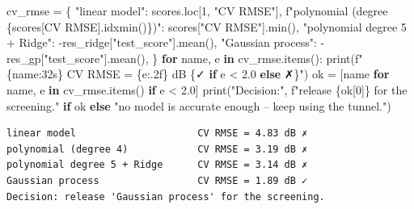 \documentclass[
  letterpaper,
  DIV=11,
  numbers=noendperiod]{scrreprt}
\newenvironment{Shaded}{\begin{snugshade}}{\end{snugshade}}
\newcommand{\BuiltInTok}[1]{\textcolor[rgb]{0.00,0.23,0.31}{#1}}
\newcommand{\ControlFlowTok}[1]{\textcolor[rgb]{0.00,0.23,0.31}{\textbf{#1}}}
\newcommand{\DecValTok}[1]{\textcolor[rgb]{0.68,0.00,0.00}{#1}}
\newcommand{\FloatTok}[1]{\textcolor[rgb]{0.68,0.00,0.00}{#1}}
\newcommand{\KeywordTok}[1]{\textcolor[rgb]{0.00,0.23,0.31}{\textbf{#1}}}
\newcommand{\NormalTok}[1]{\textcolor[rgb]{0.00,0.23,0.31}{#1}}
\newcommand{\OperatorTok}[1]{\textcolor[rgb]{0.37,0.37,0.37}{#1}}
\newcommand{\SpecialCharTok}[1]{\textcolor[rgb]{0.37,0.37,0.37}{#1}}
\newcommand{\SpecialStringTok}[1]{\textcolor[rgb]{0.13,0.47,0.30}{#1}}
\newcommand{\StringTok}[1]{\textcolor[rgb]{0.13,0.47,0.30}{#1}}
\begin{document}
\begin{Shaded}
\begin{Highlighting}[]
\NormalTok{cv\_rmse }\OperatorTok{=}\NormalTok{ \{}
    \StringTok{"linear model"}\NormalTok{: scores.loc[}\DecValTok{1}\NormalTok{, }\StringTok{"CV RMSE"}\NormalTok{],}
    \SpecialStringTok{f"polynomial (degree }\SpecialCharTok{\{}\NormalTok{scores[}\StringTok{\textquotesingle{}CV RMSE\textquotesingle{}}\NormalTok{]}\SpecialCharTok{.}\NormalTok{idxmin()}\SpecialCharTok{\}}\SpecialStringTok{)"}\NormalTok{: scores[}\StringTok{"CV RMSE"}\NormalTok{].}\BuiltInTok{min}\NormalTok{(),}
    \StringTok{"polynomial degree 5 + Ridge"}\NormalTok{: }\OperatorTok{{-}}\NormalTok{res\_ridge[}\StringTok{"test\_score"}\NormalTok{].mean(),}
    \StringTok{"Gaussian process"}\NormalTok{: }\OperatorTok{{-}}\NormalTok{res\_gp[}\StringTok{"test\_score"}\NormalTok{].mean(),}
\NormalTok{\}}
\ControlFlowTok{for}\NormalTok{ name, e }\KeywordTok{in}\NormalTok{ cv\_rmse.items():}
    \BuiltInTok{print}\NormalTok{(}\SpecialStringTok{f"}\SpecialCharTok{\{}\NormalTok{name}\SpecialCharTok{:32s\}}\SpecialStringTok{ CV RMSE = }\SpecialCharTok{\{}\NormalTok{e}\SpecialCharTok{:.2f\}}\SpecialStringTok{ dB }\SpecialCharTok{\{}\StringTok{\textquotesingle{}✓\textquotesingle{}} \ControlFlowTok{if}\NormalTok{ e }\OperatorTok{\textless{}} \FloatTok{2.0} \ControlFlowTok{else} \StringTok{\textquotesingle{}✗\textquotesingle{}}\SpecialCharTok{\}}\SpecialStringTok{"}\NormalTok{)}
\NormalTok{ok }\OperatorTok{=}\NormalTok{ [name }\ControlFlowTok{for}\NormalTok{ name, e }\KeywordTok{in}\NormalTok{ cv\_rmse.items() }\ControlFlowTok{if}\NormalTok{ e }\OperatorTok{\textless{}} \FloatTok{2.0}\NormalTok{]}
\BuiltInTok{print}\NormalTok{(}\StringTok{"Decision:"}\NormalTok{, }\SpecialStringTok{f"release \textquotesingle{}}\SpecialCharTok{\{}\NormalTok{ok[}\DecValTok{0}\NormalTok{]}\SpecialCharTok{\}}\SpecialStringTok{\textquotesingle{} for the screening."} \ControlFlowTok{if}\NormalTok{ ok }\ControlFlowTok{else} \StringTok{"no model is accurate enough – keep using the tunnel."}\NormalTok{)}
\end{Highlighting}
\end{Shaded}

\begin{verbatim}
linear model                     CV RMSE = 4.83 dB ✗
polynomial (degree 4)            CV RMSE = 3.19 dB ✗
polynomial degree 5 + Ridge      CV RMSE = 3.14 dB ✗
Gaussian process                 CV RMSE = 1.89 dB ✓
Decision: release 'Gaussian process' for the screening.
\end{verbatim}
\end{document}
